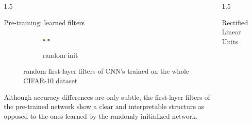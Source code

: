 \documentclass[final]{beamer}
\newlength{\onecolwid}
\begin{document}
\begin{frame}[t]
\begin{columns}[t]
\begin{column}{1.5\onecolwid}
\begin{alertblock}{Pre-training: learned filters}
\begin{figure}
\begin{subfigure}{.4\linewidth}
					\includegraphics[width=0.1\linewidth]{graphics/cifar_filters/random_17.png} %
					\includegraphics[width=0.1\linewidth]{graphics/cifar_filters/random_18.png}
					\caption{random-init}
				\end{subfigure}

				\caption{random first-layer filters of CNN's trained on the whole CIFAR-10 dataset}

			\end{figure}

			Although accuracy differences are only subtle, the first-layer filters of the pre-trained network show a clear and interpretable structure as opposed to the ones learned by the randomly initialized network.

		\end{alertblock}

	\end{column}

	\begin{column}{1.5\onecolwid}

		\begin{alertblock}{Rectified Linear Units}

			\begin{figure}
				\centering

				\begin{subfigure}{0.4\linewidth}


\end{subfigure}
\end{figure}
\end{alertblock}
\end{column}
\end{columns}
\end{frame}
\end{document}

